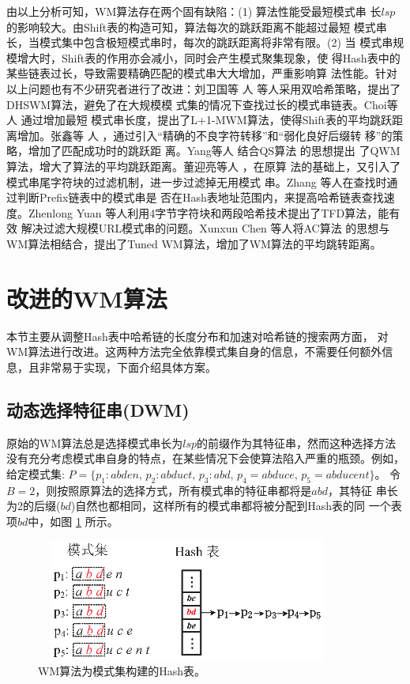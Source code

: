 由以上分析可知，WM算法存在两个固有缺陷：(1) 算法性能受最短模式串
长$lsp$的影响较大。由Shift表的构造可知，算法每次的跳跃距离不能超过最短
模式串长，当模式集中包含极短模式串时，每次的跳跃距离将非常有限。(2) 当
模式串规模增大时，Shift表的作用亦会减小，同时会产生模式聚集现象，使
得Hash表中的某些链表过长，导致需要精确匹配的模式串大大增加，严重影响算
法性能。针对以上问题也有不少研究者进行了改进：刘卫国等
人 \cite{Liu2011} 等人采用双哈希策略，提出了DHSWM算法，避免了在大规模模
式集的情况下查找过长的模式串链表。Choi等人\cite{Choi2011} 通过增加最短
模式串长度，提出了L+1-MWM算法，使得Shift表的平均跳跃距离增加。张鑫等
人 \cite{Zhang2003}，通过引入“精确的不良字符转移”和“弱化良好后缀转
移”的策略，增加了匹配成功时的跳跃距
离。Yang等人\cite{Hong2007} 结合QS算法 \cite{Sunday1990} 的思想提出
了QWM算法，增大了算法的平均跳跃距离。董迎亮等人 \cite{Dong2011}，在原算
法的基础上，又引入了模式串尾字符块的过滤机制，进一步过滤掉无用模式
串。Zhang \cite{Zhang2009b} 等人在查找时通过判断Prefix链表中的模式串是
否在Hash表地址范围内，来提高哈希链表查找速度。Zhenlong Yuan
\cite{Yuan2013} 等人利用4字节字符块和两段哈希技术提出了TFD算法，能有效
解决过滤大规模URL模式串的问题。Xunxun Chen \cite{Chen2005} 等人将AC算法
的思想与WM算法相结合，提出了Tuned WM算法，增加了WM算法的平均跳转距离。


\section{改进的WM算法}
\label{sec:5_DWM}

本节主要从调整Hash表中哈希链的长度分布和加速对哈希链的搜索两方面，
对WM算法进行改进。这两种方法完全依靠模式集自身的信息，不需要任何额外信
息，且非常易于实现，下面介绍具体方案。

\subsection{动态选择特征串(DWM)}
\label{sec:5_DWM
}

原始的WM算法总是选择模式串长为$lsp$的前缀作为其特征串，然而这种选择方法
没有充分考虑模式串自身的特点，在某些情况下会使算法陷入严重的瓶颈。例如，
给定模式集:
$P=\{p_1:abden,\, p_2:abduct,\, p_3:abd,\, p_4=abduce,\,
p_5=abducent\}$。
令$B=2$，则按照原算法的选择方式，所有模式串的特征串都将是$abd$，其特征
串长为2的后缀($bd$)自然也都相同，这样所有的模式串都将被分配到Hash表的同
一个表项$bd$中，如图 \ref{fig:WM_hash_table1} 所示。


\begin{figure}[H]
  \centering
  \includegraphics[height=4cm ,width=10cm]{figures/5_WM/WM_hash_table1.eps}
  \caption{WM算法为模式集构建的Hash表。}
  \label{fig:WM_hash_table1}
\end{figure}

